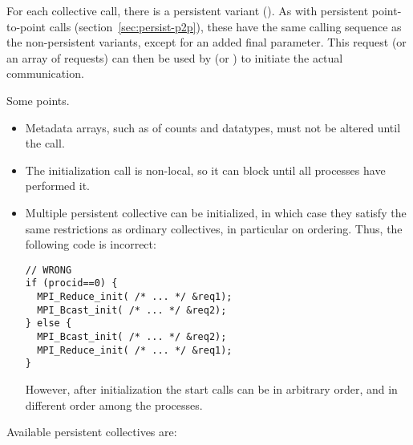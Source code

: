 \begin{mpifour}
For each collective call, there is a persistent variant ().
As with persistent point-to-point calls (section~\ref{sec:persist-p2p}),
these have the same calling sequence as the non-persistent variants,
except for an added final  parameter.
This request (or an array of requests) can then be used by
 (or )
to initiate the actual communication.

Some points.
\begin{itemize}
\item
  Metadata arrays, such as of counts and datatypes,
  must not be altered until the  call.
\item The initialization call is non-local, so it can block until all
  processes have performed it.
\item Multiple persistent collective can be initialized, in which case
  they satisfy the same restrictions as ordinary collectives, in particular
  on ordering. Thus, the following code is incorrect:
\begin{lstlisting}
// WRONG
if (procid==0) {
  MPI_Reduce_init( /* ... */ &req1);
  MPI_Bcast_init( /* ... */ &req2);
} else {
  MPI_Bcast_init( /* ... */ &req2);
  MPI_Reduce_init( /* ... */ &req1);
}
\end{lstlisting}
However, after initialization the start calls can be in arbitrary order,
and in different order among the processes.
\end{itemize}

\begin{raggedright}
  Available persistent collectives are:
\end{raggedright}

\end{mpifour}

